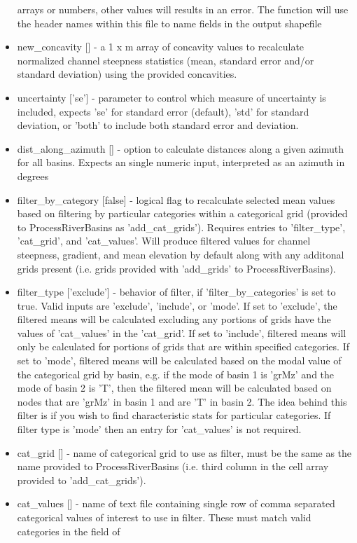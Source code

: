 \begin{itemize}
arrays or numbers, other values will results in an error. The function will use the header names within this file to name fields in the output shapefile 
\item new\_concavity [] - a 1 x m array of concavity values to recalculate normalized channel steepness statistics (mean, standard error and/or standard deviation) using the
provided concavities.
\item uncertainty ['se'] - parameter to control which measure of uncertainty is included, expects 'se' for standard error (default), 'std' for standard deviation, or 'both'
to include both standard error and deviation.
\item dist\_along\_azimuth [] - option to calculate distances along a given azimuth for all basins. Expects an single numeric input, interpreted as an azimuth in degrees 
\item filter\_by\_category [false] - logical flag to recalculate selected mean values based on filtering by particular categories within a categorical grid (provided to
ProcessRiverBasins as 'add\_cat\_grids'). Requires entries to 'filter\_type', 'cat\_grid', and 'cat\_values'. Will produce filtered values for channel steepness, gradient,
and mean  elevation by default along with any additonal grids present (i.e. grids provided with 'add\_grids' to ProcessRiverBasins).
\item filter\_type ['exclude'] - behavior of filter, if 'filter\_by\_categories' is set to true. Valid inputs are 'exclude', 'include', or 'mode'. If set to 'exclude', the filtered 
means will be calculated excluding any portions of grids have the values of 'cat\_values' in the 'cat\_grid'. If set to 'include', filtered means will only be calculated 
for portions of grids that are within specified categories. If set to 'mode', filtered means will be calculated based on the modal value of the categorical grid by basin,
e.g. if the mode of basin 1 is 'grMz' and the mode of basin 2 is 'T', then the filtered mean will be calculated based on nodes that are 'grMz' in basin 1 and are 'T' in 
basin 2. The idea behind this filter is if you wish to find characteristic stats for particular categories. If filter type is 'mode' then an entry for 'cat\_values' is not
required.
\item cat\_grid [] - name of categorical grid to use as filter, must be the same as the name provided to ProcessRiverBasins (i.e. third column in the cell array provided to
'add\_cat\_grids').
\item cat\_values [] - name of text file containing single row of comma separated categorical values of interest to use in filter. These must match valid categories in the field of 

\end{itemize}
